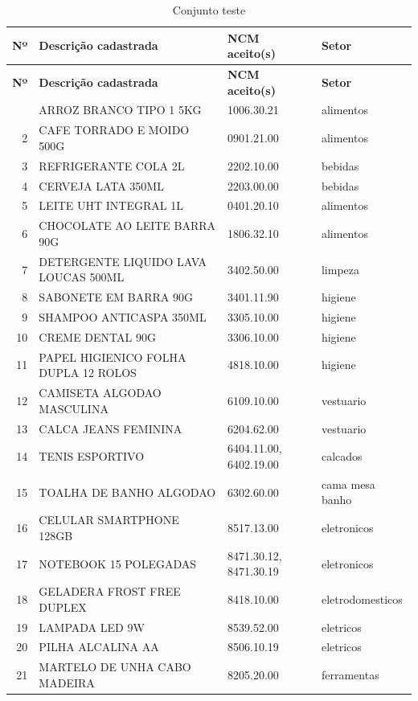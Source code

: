 \begin{apendicesenv}
\begin{center}
\small
\begin{longtable}{r p{6.6cm} p{4.4cm} p{2.6cm}}
\caption{Conjunto teste}\label{tab:ap_teste} \\
\hline
\textbf{Nº} & \textbf{Descrição cadastrada} & \textbf{NCM aceito(s)} & \textbf{Setor} \\
\hline
\endfirsthead
\hline
\textbf{Nº} & \textbf{Descrição cadastrada} & \textbf{NCM aceito(s)} & \textbf{Setor} \\
\hline
\endhead
\hline
\endfoot
1 & ARROZ BRANCO TIPO 1 5KG & 1006.30.21 & alimentos \\
2 & CAFE TORRADO E MOIDO 500G & 0901.21.00 & alimentos \\
3 & REFRIGERANTE COLA 2L & 2202.10.00 & bebidas \\
4 & CERVEJA LATA 350ML & 2203.00.00 & bebidas \\
5 & LEITE UHT INTEGRAL 1L & 0401.20.10 & alimentos \\
6 & CHOCOLATE AO LEITE BARRA 90G & 1806.32.10 & alimentos \\
7 & DETERGENTE LIQUIDO LAVA LOUCAS 500ML & 3402.50.00 & limpeza \\
8 & SABONETE EM BARRA 90G & 3401.11.90 & higiene \\
9 & SHAMPOO ANTICASPA 350ML & 3305.10.00 & higiene \\
10 & CREME DENTAL 90G & 3306.10.00 & higiene \\
11 & PAPEL HIGIENICO FOLHA DUPLA 12 ROLOS & 4818.10.00 & higiene \\
12 & CAMISETA ALGODAO MASCULINA & 6109.10.00 & vestuario \\
13 & CALCA JEANS FEMININA & 6204.62.00 & vestuario \\
14 & TENIS ESPORTIVO & 6404.11.00, 6402.19.00 & calcados \\
15 & TOALHA DE BANHO ALGODAO & 6302.60.00 & cama mesa banho \\
16 & CELULAR SMARTPHONE 128GB & 8517.13.00 & eletronicos \\
17 & NOTEBOOK 15 POLEGADAS & 8471.30.12, 8471.30.19 & eletronicos \\
18 & GELADERA FROST FREE DUPLEX & 8418.10.00 & eletrodomesticos \\
19 & LAMPADA LED 9W & 8539.52.00 & eletricos \\
20 & PILHA ALCALINA AA & 8506.10.19 & eletricos \\
21 & MARTELO DE UNHA CABO MADEIRA & 8205.20.00 & ferramentas \\

\end{longtable}
\end{center}
\end{apendicesenv}
